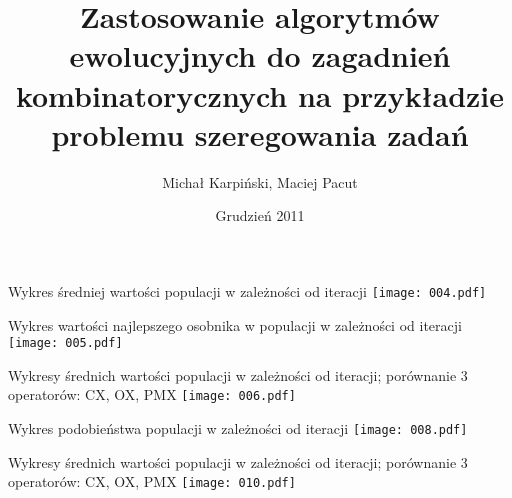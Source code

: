 \documentclass{beamer}
\title{Zastosowanie algorytmów ewolucyjnych do zagadnień kombinatorycznych na przykładzie problemu szeregowania zadań}
\author{Michał Karpiński, Maciej Pacut}
\date{Grudzień 2011}
\begin{document}
\maketitle
 
\begin{frame}{Wykres średniej wartości populacji w zależności od iteracji}
  \texttt{[image: 004.pdf]}
\end{frame}

\begin{frame}{Wykres wartości najlepszego osobnika w populacji w
    zależności od iteracji}
  \texttt{[image: 005.pdf]}
\end{frame}

\begin{frame}{Wykresy średnich wartości populacji w zależności od
    iteracji; porównanie 3 operatorów: CX, OX, PMX}
  \texttt{[image: 006.pdf]}
\end{frame}

\begin{frame}{Wykres podobieństwa populacji w zależności od iteracji}
  \texttt{[image: 008.pdf]}
\end{frame}


\begin{frame}{Wykresy średnich wartości populacji w zależności od
    iteracji; porównanie 3 operatorów: CX, OX, PMX}
  \texttt{[image: 010.pdf]}
\end{frame}
\end{document}
